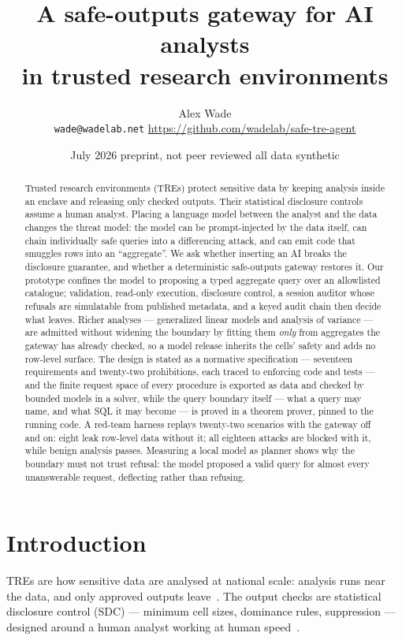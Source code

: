 \documentclass[11pt,a4paper]{article}
\title{A safe-outputs gateway for AI analysts\\in trusted research environments}
\author{Alex Wade\\\small\texttt{wade@wadelab.net} \;\textperiodcentered\;
  \small\url{https://github.com/wadelab/safe-tre-agent}}
\date{\small July 2026 \;\textperiodcentered\; preprint, not peer reviewed \;\textperiodcentered\; all data synthetic}
\begin{document}
\maketitle

\begin{abstract}
\noindent Trusted research environments (TREs) protect sensitive data by
keeping analysis inside an enclave and releasing only checked outputs. Their
statistical disclosure controls assume a human analyst. Placing a language
model between the analyst and the data changes the threat model: the model can
be prompt-injected by the data itself, can chain individually safe queries
into a differencing attack, and can emit code that smuggles rows into an
``aggregate''. We ask whether inserting an AI breaks the disclosure guarantee,
and whether a deterministic safe-outputs gateway restores it. Our prototype
confines the model to proposing a typed aggregate query over an allowlisted
catalogue; validation, read-only execution, disclosure control, a session
auditor whose refusals are simulatable from published metadata, and a keyed
audit chain then decide what leaves. Richer analyses --- generalized linear
models and analysis of variance --- are admitted without widening the boundary
by fitting them \emph{only} from aggregates the gateway has already checked, so
a model release inherits the cells' safety and adds no row-level surface. The
design is stated as a normative specification --- seventeen requirements and
twenty-two prohibitions, each traced to enforcing code and tests --- and the
finite request space of every procedure is exported as data and checked by
bounded models in a solver, while the query boundary itself --- what a query
may name, and what SQL it may become --- is proved in a theorem prover, pinned
to the running code. A red-team harness replays twenty-two scenarios with
the gateway off and on: eight leak row-level data without it; all eighteen
attacks are blocked with it, while benign analysis passes. Measuring a local
model as planner shows why the boundary must not trust refusal: the model
proposed a valid query for almost every unanswerable request, deflecting rather
than refusing.
\end{abstract}

\section{Introduction}

TREs are how sensitive data are analysed at national scale: analysis runs near
the data, and only approved outputs leave~\cite{opensafely2020}. The output
checks are statistical disclosure control (SDC) --- minimum cell sizes,
dominance rules, suppression --- designed around a human analyst working at
human speed~\cite{hundepool2012}.
\end{document}
